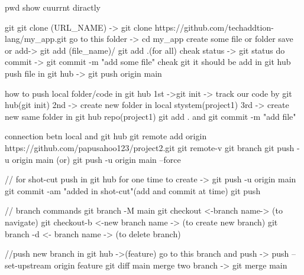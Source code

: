 pwd
show cuurrnt diractly

git   
git clone (URL_NAME) -> git clone https://github.com/techaddtion-lang/my_app.git
go to this folder -> cd my_app
create some file or folder
save or add-> git add (file_name)/ git add .(for all)
cheak status -> git status
do commit -> git commit -m "add some file" 
cheak git it should be add in git hub
push file in git hub -> git push  origin main      



how to push local folder/code in git hub 
1st ->git init -> track our code by git hub(git init)
2nd -> create new folder in local stystem(project1)
3rd -> create new same folder in git hub repo(project1)
git add . and git commit -m "add file"

connection betn local and git hub
git remote add origin https://github.com/papusahoo123/project2.git
git remote-v
git branch 
git push -u origin main (or) git push -u origin main --force   


// for shot-cut push in git hub
for one time to create ->  git push -u origin main 
git commit -am "added in shot-cut"(add and commit at time)
git push 




// branch commands
git branch -M main
git  checkout  <-branch name-> (to navigate)
git  checkout-b <-new branch name -> (to create new branch)
git branch  -d <- branch name -> (to delete  branch)

//push new branch in git hub ->(feature)
go to this  branch and push -> push --set-upstream origin feature
git diff main
merge two branch -> git merge main
